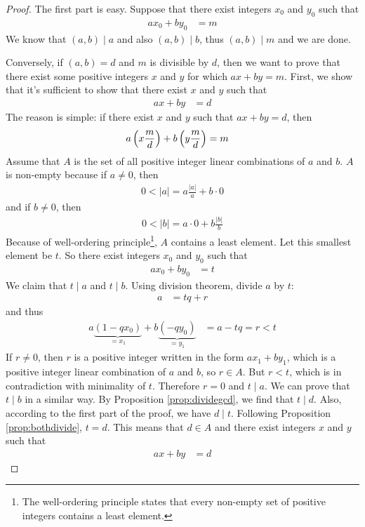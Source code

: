 \begin{proof}
	The first part is easy. Suppose that there exist integers $x_0$ and $y_0$ such that
	\begin{align*}
		ax_0 + by_0
			& = m
	\end{align*}
	We know that $(a,b)\mid a$ and also $(a,b)\mid b$, thus $(a,b)\mid m$ and we are done.

	Conversely, if $(a,b)=d$ and $m$ is divisible by $d$, then we want to prove that there exist some positive integers $x$ and $y$ for which $ax+by=m$. First, we show that it's sufficient to show that there exist $x$ and $y$ such that
	\begin{align*}
		ax + by
			& = d
	\end{align*}
	The reason is simple: if there exist $x$ and $y$ such that $ax + by = d$, then
	\begin{align*}
		a\left(x \frac{m}{d}\right) + b \left(y \frac{m}{d}\right)
			& = m
	\end{align*}
	Assume that $A$ is the set of all positive integer linear combinations of $a$ and $b$. $A$ is non-empty because if $a \neq 0$, then
	\begin{align*}
		0<|a| = a\frac{|a|}{a} + b\cdot 0
	\end{align*}
	and if $b \neq 0$, then
	\begin{align*}	0<|b| =  a\cdot 0 + b \frac{|b|}{b}\end{align*}
	Because of well-ordering principle\footnote{The well-ordering principle states that every non-empty set of positive integers contains a least element.}, $A$ contains a least element. Let this smallest element be $t$. So there exist integers $x_0$ and $y_0$ such that
		\begin{align*}
			ax_0 + by_0
				& = t
		\end{align*}
	We claim that $t\mid a$ and $t\mid b$. Using division theorem, divide $a$ by $t$:
		\begin{align*}
			a
				& = tq+r
		\end{align*}
	and thus
		\begin{align*}
			a\underbrace{(1-qx_0)}_{=x_1}+b\underbrace{(-qy_0)}_{=y_1}
				& =a-tq=r<t
		\end{align*}
	If $r \neq 0$, then $r$ is a positive integer written in the form $ax_1+by_1$, which is a positive integer linear combination of $a$ and $b$, so $r \in A$. But $r<t$, which is in contradiction with minimality of $t$. Therefore $r=0$ and $t\mid a$. We can prove that $t\mid b$ in a similar way. By Proposition \ref{prop:dividegcd}, we find that $t\mid d$. Also, according to the first part of the proof, we have $d\mid t$. Following Proposition \ref{prop:bothdivide}, $t=d$. This means that $d \in A$ and there exist integers $x$ and $y$ such that
	\begin{align*}
		ax + by
			& = d
	\end{align*}
\end{proof}

